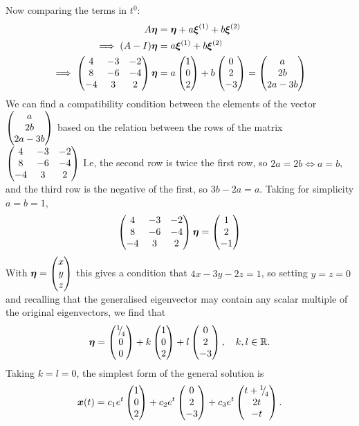 \begin{eg}
	Now comparing the terms in $t^0$:
	\begin{align*}
		A\bm{\eta} &= \bm{\eta} + a\bm{\xi}^{(1)} + b\bm{\xi}^{(2)} \\
		\implies (A-I)\bm{\eta} &= a\bm{\xi}^{(1)} + b\bm{\xi}^{(2)} \\
		\implies \begin{pmatrix}4 & -3 & -2 \\ 8 & -6 & -4 \\ -4 & 3 & 2\end{pmatrix}\bm{\eta} &= a\begin{pmatrix}1 \\ 0 \\ 2\end{pmatrix} + b\begin{pmatrix}0 \\ 2 \\ -3\end{pmatrix} = \begin{pmatrix}a \\ 2b \\ 2a-3b\end{pmatrix}
	\end{align*}
	We can find a compatibility condition between the elements of the vector $\begin{pmatrix}a \\ 2b \\ 2a-3b\end{pmatrix}$ based on the relation between the rows of the matrix $\begin{pmatrix}4 & -3 & -2 \\ 8 & -6 & -4 \\ -4 & 3 & 2\end{pmatrix}$ I.e, the second row is twice the first row, so $2a = 2b \iff a=b$, and the third row is the negative of the first, so $3b-2a = a$. Taking for simplicity $a=b=1$,
	\begin{align*}
		\begin{pmatrix}4 & -3 & -2 \\ 8 & -6 & -4 \\ -4 & 3 & 2\end{pmatrix}\bm{\eta} = \begin{pmatrix}1 \\ 2 \\ -1\end{pmatrix}
	\end{align*}
	With $\bm{\eta} = \begin{pmatrix}x \\ y \\ z\end{pmatrix}$ this gives a condition that $4x-3y-2z = 1$, so setting $y=z=0$ and recalling that the generalised eigenvector may contain any scalar multiple of the original eigenvectors, we find that
	\[
	\bm{\eta} = \begin{pmatrix}{}^{1}{\mskip -5mu/\mskip -3mu}_{4} \\ 0 \\ 0\end{pmatrix} + k\begin{pmatrix}1 \\ 0 \\ 2\end{pmatrix} + l\begin{pmatrix}0 \\ 2 \\ -3\end{pmatrix}, \quad k,l \in \mathbb{R}.
	\]
	Taking $k=l=0$, the simplest form of the general solution is
	\[
	\bm{x}(t) = c_1 e^t \begin{pmatrix}1 \\ 0 \\ 2\end{pmatrix} + c_2 e^t \begin{pmatrix}0 \\ 2 \\ -3\end{pmatrix} + c_3 e^t \begin{pmatrix}t + {}^{1}{\mskip -5mu/\mskip -3mu}_{4} \\ 2t \\ -t\end{pmatrix}.
	\]
\end{eg}


